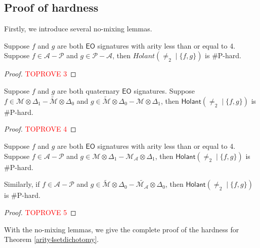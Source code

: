 \documentclass[a4paper,UKenglish,cleveref, autoref, thm-restate]{lipics-v2021}
\newcommand{\hol}[0]{\textsf{Holant}}
\newcommand{\eo}[0]{\textsf{EO}}
\begin{document}
\subsection{Proof of hardness}\label{subsection:4aritysethardness}
Firstly, we introduce several no-mixing lemmas.


\begin{lemma}\label{lem:mixAPhard}
Suppose $f$ and $g$ are both $\eo$ signatures with arity less than or equal to 4. Suppose $f\in\mathscr{A}-\mathscr{P}$ and $g\in\mathscr{P}-\mathscr{A}$, then $Holant(\neq_2\mid\{f,g\})$ is \#P-hard.
\end{lemma}

\begin{proof}\textcolor{red}{TOPROVE 3}\end{proof}



\begin{lemma}\label{lem:mixMM'hard}
Suppose $f$ and $g$ are both quaternary $\eo$ signatures. Suppose $f\in\mathscr{M}\otimes\Delta_1-\widetilde{\mathscr{M}}\otimes\Delta_0$ and $g\in\widetilde{\mathscr{M}}\otimes\Delta_0-\mathscr{M}\otimes\Delta_1$, then $\hol(\neq_2\mid\{f,g\})$ is \#P-hard.
\end{lemma}
\begin{proof}\textcolor{red}{TOPROVE 4}\end{proof}


\begin{lemma}\label{lem:mixAP and Mtensorhard}
Suppose $f$ and $g$ are both $\eo$ signatures with arity less than or equal to 4. Suppose $f\in\mathscr{A}-\mathscr{P}$ and $g\in\mathscr{M}\otimes\Delta_1-\mathscr{M}_\mathscr{A}\otimes\Delta_1$, then $\hol(\neq_2\mid\{f,g\})$ is \#P-hard.

Similarly, if $f\in\mathscr{A}-\mathscr{P}$ and $g\in\widetilde{\mathscr{M}}\otimes\Delta_0-\widetilde{\mathscr{M}_\mathscr{A}}\otimes\Delta_0$, then $\hol(\neq_2\mid\{f,g\})$ is \#P-hard.
\end{lemma}
\begin{proof}\textcolor{red}{TOPROVE 5}\end{proof}

With the no-mixing lemmas, we give the complete proof of the hardness for Theorem \ref{arity4setdichotomy}.
\end{document}
